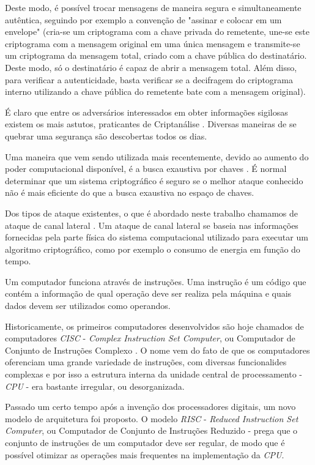 Deste modo, é possível trocar mensagens de maneira segura e simultaneamente
autêntica, seguindo por exemplo a convenção de "assinar e colocar em um
envelope" (cria-se um criptograma com a chave privada do remetente, une-se este
criptograma com a mensagem original em uma única mensagem e transmite-se um
criptograma da mensagem total, criado com a chave pública do destinatário. Deste
modo, só o destinatário é capaz de abrir a mensagem total. Além disso, para
verificar a autenticidade, basta verificar se a decifragem do criptograma
interno utilizando a chave pública do remetente bate com a mensagem original).

É claro que entre os adversários interessados em obter informações sigilosas
existem os mais astutos, praticantes de Criptanálise
\cite{cryptanalysis}. Diversas maneiras de se quebrar uma segurança são
descobertas todos os dias.

Uma maneira que vem sendo utilizada mais recentemente, devido ao aumento do
poder computacional disponível, é a busca exaustiva por chaves
\cite{agosta2012exploiting}. É normal determinar que um sistema criptográfico é
seguro se o melhor ataque conhecido não é mais eficiente do que a busca
exaustiva no espaço de chaves.

Dos tipos de ataque existentes, o que é abordado neste trabalho chamamos de
ataque de canal lateral \cite{mohamed2013improved}. Um ataque de canal lateral
se baseia nas informações fornecidas pela parte física do sistema computacional
utilizado para executar um algoritmo criptográfico, como por exemplo o consumo
de energia em função do tempo.


Um computador funciona através de instruções. Uma instrução é um código que
contém a informação de qual operação deve ser realiza pela máquina e quais dados
devem ser utilizados como operandos.

Historicamente, os primeiros computadores desenvolvidos são hoje chamados de
computadores \textit{CISC} - \textit{Complex Instruction Set Computer}, ou
Computador de Conjunto de Instruções Complexo \cite{chang1999customization}. O
nome vem do fato de que os computadores oferenciam uma grande variedade de
instruções, com diversas funcionalides complexas e por isso a estrutura interna
da unidade central de processamento - \textit{CPU} - era bastante irregular, ou
desorganizada.

Passado um certo tempo após a invenção dos processadores digitais, um novo
modelo de arquitetura foi proposto. O modelo \textit{RISC} - \textit{Reduced
  Instruction Set Computer}, ou Computador de Conjunto de Instruções Reduzido
\cite{patterson} - prega que o conjunto de instruções de um computador deve ser
regular, de modo que é possível otimizar as operações mais frequentes na
implementação da \textit{CPU}.

